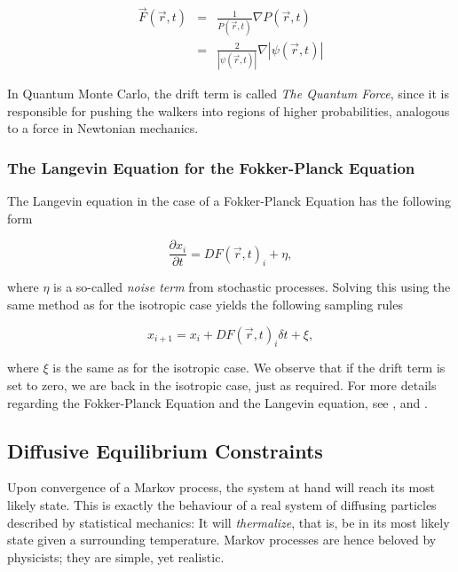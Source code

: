 \begin{eqnarray}
 \vec F(\vec r, t) &=& \frac{1}{P(\vec r, t)}\nabla P(\vec r, t) \nonumber \\
                   &=& \frac{2}{|\psi(\vec r, t)|}\nabla |\psi(\vec r, t)|
\end{eqnarray}

In Quantum Monte Carlo, the drift term is called \textit{The Quantum Force}, since it is responsible for pushing the walkers into regions of higher probabilities, analogous to a force in Newtonian mechanics.

\subsubsection{The Langevin Equation for the Fokker-Planck Equation}

The Langevin equation in the case of a Fokker-Planck Equation has the following form

\begin{equation}
 \frac{\partial x_i}{\partial t} = D F(\vec r, t)_i + \eta,
\end{equation}

where $\eta$ is a so-called \textit{noise term} from stochastic processes. Solving this using the same method as for the isotropic case yields the following sampling rules

\begin{equation}
 x_{i+1} = x_i + DF(\vec r, t)_i\delta t + \xi,
 \label{eq:langevinSolFP}
\end{equation}

where $\xi$ is the same as for the isotropic case. We observe that if the drift term is set to zero, we are back in the isotropic case, just as required. For more details regarding the Fokker-Planck Equation and the Langevin equation, see \cite{Gardiner:2004bk}, \cite{risken1989fpe} and \cite{langevin}.


\subsection{Diffusive Equilibrium Constraints}

Upon convergence of a Markov process, the system at hand will reach its most likely state. This is exactly the behaviour of a real system of diffusing particles described by statistical mechanics: It will \textit{thermalize}, that is, be in its most likely state given a surrounding temperature. Markov processes are hence beloved by physicists; they are simple, yet realistic. 

